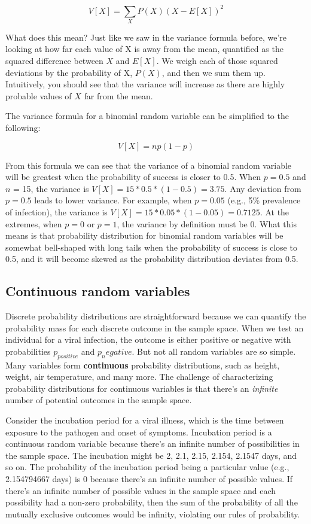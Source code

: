 \documentclass[
]{book}
\begin{document}
\[
V[X]=\sum_{X}P(X)(X-E[X])^2
\]

What does this mean? Just like we saw in the variance formula before, we're looking at how far each value of X is away from the mean, quantified as the squared difference between \(X\) and \(E[X]\). We weigh each of those squared deviations by the probability of X, \(P(X)\), and then we sum them up. Intuitively, you should see that the variance will increase as there are highly probable values of \(X\) far from the mean.

The variance formula for a binomial random variable can be simplified to the following:

\[
V[X]=np(1-p)
\]

From this formula we can see that the variance of a binomial random variable will be greatest when the probability of success is closer to 0.5. When \(p=0.5\) and \(n\) = 15, the variance is \(V[X]=15*0.5*(1-0.5)=3.75\). Any deviation from \(p = 0.5\) leads to lower variance. For example, when \(p=0.05\) (e.g., 5\% prevalence of infection), the variance is \(V[X]=15*0.05*(1-0.05)=0.7125\). At the extremes, when \(p = 0\) or \(p = 1\), the variance by definition must be 0. What this means is that probability distribution for binomial random variables will be somewhat bell-shaped with long tails when the probability of success is close to 0.5, and it will become skewed as the probability distribution deviates from 0.5.

\subsection{Continuous random variables}\label{continuous-random-variables}

Discrete probability distributions are straightforward because we can quantify the probability mass for each discrete outcome in the sample space. When we test an individual for a viral infection, the outcome is either positive or negative with probabilities \(p_{positive}\) and \(p_negative\). But not all random variables are so simple. Many variables form \textbf{continuous} probability distributions, such as height, weight, air temperature, and many more. The challenge of characterizing probability distributions for continuous variables is that there's an \emph{infinite} number of potential outcomes in the sample space.

Consider the incubation period for a viral illness, which is the time between exposure to the pathogen and onset of symptoms. Incubation period is a continuous random variable because there's an infinite number of possibilities in the sample space. The incubation might be 2, 2.1, 2.15, 2.154, 2.1547 days, and so on. The probability of the incubation period being a particular value (e.g., 2.154794667 days) is 0 because there's an infinite number of possible values. If there's an infinite number of possible values in the sample space and each possibility had a non-zero probability, then the sum of the probability of all the mutually exclusive outcomes would be infinity, violating our rules of probability.
\end{document}
